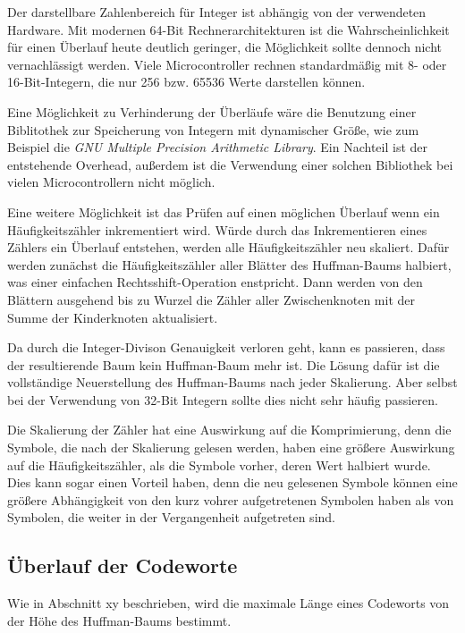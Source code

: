 \documentclass[twoside,11pt,a4paper]{article}
\theoremstyle{break}
\begin{document}
Der darstellbare Zahlenbereich für Integer ist abhängig von der
verwendeten Hardware. Mit modernen 64-Bit Rechnerarchitekturen ist die
Wahrscheinlichkeit für einen Überlauf heute deutlich geringer, die
Möglichkeit sollte dennoch nicht vernachlässigt werden. Viele
Microcontroller rechnen standardmäßig mit 8- oder 16-Bit-Integern, die
nur 256 bzw. 65536 Werte darstellen können.

Eine Möglichkeit zu Verhinderung der Überläufe wäre die Benutzung
einer Biblitothek zur Speicherung von Integern mit dynamischer Größe,
wie zum Beispiel die \emph{GNU Multiple Precision Arithmetic
  Library}. Ein Nachteil ist der entstehende Overhead, außerdem ist
die Verwendung einer solchen Bibliothek bei vielen Microcontrollern
nicht möglich. \cite{GMP}

Eine weitere Möglichkeit ist das Prüfen auf einen möglichen Überlauf
wenn ein Häufigkeitszähler inkrementiert wird. Würde durch das
Inkrementieren eines Zählers ein Überlauf entstehen, werden alle
Häufigkeitszähler neu skaliert. Dafür werden zunächst die
Häufigkeitszähler aller Blätter des Huffman-Baums halbiert, was einer
einfachen Rechtsshift-Operation enstpricht. Dann werden von den
Blättern ausgehend bis zu Wurzel die Zähler aller Zwischenknoten mit
der Summe der Kinderknoten aktualisiert.

Da durch die Integer-Divison Genauigkeit verloren geht, kann es
passieren, dass der resultierende Baum kein Huffman-Baum mehr ist. Die
Lösung dafür ist die vollständige Neuerstellung des Huffman-Baums nach
jeder Skalierung. Aber selbst bei der Verwendung von 32-Bit Integern
sollte dies nicht sehr häufig passieren.


Die Skalierung der Zähler hat eine Auswirkung auf die Komprimierung,
denn die Symbole, die nach der Skalierung gelesen werden, haben eine
größere Auswirkung auf die Häufigkeitszähler, als die Symbole vorher,
deren Wert halbiert wurde.  Dies kann sogar einen Vorteil haben, denn
die neu gelesenen Symbole können eine größere Abhängigkeit von den
kurz vohrer aufgetretenen Symbolen haben als von Symbolen, die weiter
in der Vergangenheit aufgetreten sind.

\subsection{Überlauf der Codeworte}
Wie in Abschnitt xy beschrieben, wird die maximale Länge eines
Codeworts von der Höhe des Huffman-Baums bestimmt.
\end{document}
